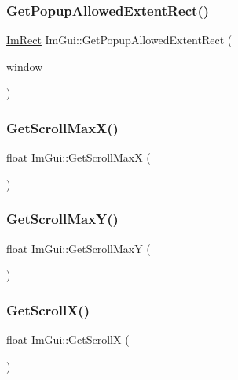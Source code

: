 \subsubsection{\texorpdfstring{Get\+Popup\+Allowed\+Extent\+Rect()}{GetPopupAllowedExtentRect()}}
{\footnotesize\ttfamily \hyperlink{structImRect}{Im\+Rect} Im\+Gui\+::\+Get\+Popup\+Allowed\+Extent\+Rect (\begin{DoxyParamCaption}\item[{\hyperlink{structImGuiWindow}{Im\+Gui\+Window} $\ast$}]{window }\end{DoxyParamCaption})}

\mbox{\label{namespaceImGui_af472cb090157c22e65a0aa1662b9f3d0}} 
\subsubsection{\texorpdfstring{Get\+Scroll\+Max\+X()}{GetScrollMaxX()}}
{\footnotesize\ttfamily float Im\+Gui\+::\+Get\+Scroll\+MaxX (\begin{DoxyParamCaption}{ }\end{DoxyParamCaption})}

\mbox{\label{namespaceImGui_ab34c0d5c63908a7ff50923151730f76a}} 
\subsubsection{\texorpdfstring{Get\+Scroll\+Max\+Y()}{GetScrollMaxY()}}
{\footnotesize\ttfamily float Im\+Gui\+::\+Get\+Scroll\+MaxY (\begin{DoxyParamCaption}{ }\end{DoxyParamCaption})}

\mbox{\label{namespaceImGui_a6f88335d87da3be81dc6e24cb1812923}} 
\subsubsection{\texorpdfstring{Get\+Scroll\+X()}{GetScrollX()}}
{\footnotesize\ttfamily float Im\+Gui\+::\+Get\+ScrollX (\begin{DoxyParamCaption}{ }\end{DoxyParamCaption})}

